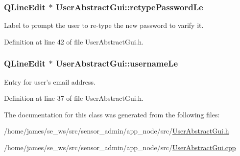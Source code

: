 \hypertarget{class_user_abstract_gui_a237ffc88f49abdaf80d0a2ca13614082}{
\subsubsection[{retype\-Password\-Le}]{\setlength{\rightskip}{0pt plus 5cm}Q\-Line\-Edit $\ast$ User\-Abstract\-Gui\-::retype\-Password\-Le\hspace{0.3cm}{\ttfamily [private]}}}\label{class_user_abstract_gui_a237ffc88f49abdaf80d0a2ca13614082}
Label to prompt the user to re-\/type the new password to varify it. 

Definition at line 42 of file User\-Abstract\-Gui.\-h.

\hypertarget{class_user_abstract_gui_acfbb80fed175f16538b040da8b831a49}{
\subsubsection[{username\-Le}]{\setlength{\rightskip}{0pt plus 5cm}Q\-Line\-Edit $\ast$ User\-Abstract\-Gui\-::username\-Le\hspace{0.3cm}{\ttfamily [private]}}}\label{class_user_abstract_gui_acfbb80fed175f16538b040da8b831a49}
Entry for user's email address. 

Definition at line 37 of file User\-Abstract\-Gui.\-h.



The documentation for this class was generated from the following files\-:\begin{DoxyCompactItemize}
\item 
/home/james/se\-\_\-ws/src/sensor\-\_\-admin/app\-\_\-node/src/\hyperlink{app__node_2src_2_user_abstract_gui_8h}{User\-Abstract\-Gui.\-h}\item 
/home/james/se\-\_\-ws/src/sensor\-\_\-admin/app\-\_\-node/src/\hyperlink{app__node_2src_2_user_abstract_gui_8cpp}{User\-Abstract\-Gui.\-cpp}\end{DoxyCompactItemize}
